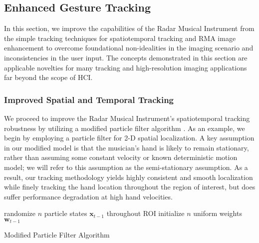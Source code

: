 \documentclass[10pt,journal,final]{IEEEtran}
\begin{document}
\subsection{Enhanced Gesture Tracking}
\label{subsec:enhanced_gesture_tracking}
In this section, we improve the capabilities of the Radar Musical Instrument from the simple tracking techniques for spatiotemporal tracking and RMA image enhancement to overcome foundational non-idealities in the imaging scenario and inconsistencies in the user input. The concepts demonstrated in this section are applicable novelties for many tracking and high-resolution imaging applications far beyond the scope of HCI.

\subsubsection{Improved Spatial and Temporal Tracking}
\label{subsubsec:improved_spatial_and_temporal_tracking}
We proceed to improve the Radar Musical Instrument's spatiotemporal tracking robustness by utilizing a modified particle filter algorithm \cite{tracking:condensation_algorithm_radar}. As an example, we begin by employing a particle filter for 2-D spatial localization. A key assumption in our modified model is that the musician's hand is likely to remain stationary, rather than assuming some constant velocity or known deterministic motion model; we will refer to this assumption as the semi-stationary assumption. As a result, our tracking methodology yields highly consistent and smooth localization while finely tracking the hand location throughout the region of interest, but does suffer performance degradation at high hand velocities.

\begin{algorithm}[h]
	\label{algo:particle_filter}
	\SetAlgoLined
	randomize $n$ particle states $\bm{x}_{t-1}$ throughout ROI\;
	initialize $n$ uniform weights $\bm{w}_{t-1}$\;
	\caption{Modified Particle Filter Algorithm}
\end{algorithm}
\end{document}
